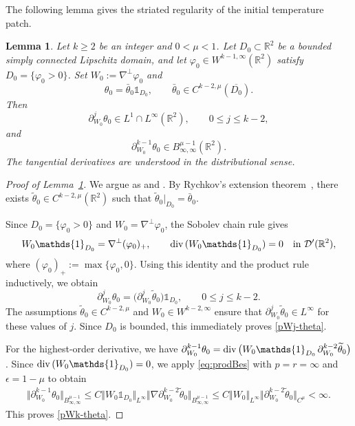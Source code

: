 \documentclass[reqno,11pt,a4paper]{amsart}
\newtheorem{lemma}[theorem]{Lemma}
\newcommand{\R}{\ensuremath{\mathbb{R}}}
\renewcommand{\div}{{\rm div\,}}
\begin{document}
The following lemma gives the striated regularity
of the initial temperature patch.
\begin{lemma}\label{lem:pWk-theta}
Let $k\geq2$ be an integer and $0<\mu<1$.
Let $D_0\subset\R^2$ be a bounded simply connected
Lipschitz domain, and let
$\varphi_0\in W^{k-1,\infty}(\R^2)$ satisfy
$D_0=\{\varphi_0>0\}$.
Set $W_0:=\nabla^\perp\varphi_0$ and
\[
  \theta_0=\bar\theta_0\mathds{1}_{D_0},
  \qquad
  \bar\theta_0\in C^{k-2,\mu}(\overline{D_0}).
\]
Then
\begin{equation}\label{pWj-theta}
  \partial_{W_0}^j\theta_0
  \in L^1\cap L^\infty(\R^2),
  \qquad 0\leq j\leq k-2,
\end{equation}
and
\begin{equation}\label{pWk-theta}
  \partial_{W_0}^{k-1}\theta_0
  \in B^{\mu-1}_{\infty,\infty}(\R^2).
\end{equation}
The tangential derivatives are understood
in the distributional sense.
\end{lemma}

\begin{proof}[Proof of Lemma~\ref{lem:pWk-theta}]
We argue as \cite[Proposition 3.1]{Sue15} and \cite[Lemma 2.6]{CMX22}.
By Rychkov's extension theorem~\cite{VSR1999},
there exists
$\widetilde\theta_0\in C^{k-2,\mu}(\R^2)$
such that
$\widetilde\theta_0|_{D_0}=\bar\theta_0$.

Since $D_0=\{\varphi_0>0\}$ and
$W_0=\nabla^\perp\varphi_0$,
the Sobolev chain rule gives
\[
  W_0\mathds{1}_{D_0}
  =\nabla^\perp(\varphi_0)_+,
  \qquad
  \div(W_0\mathds{1}_{D_0})=0
  \quad\text{in }\mathcal D'(\R^2),
\]
where $(\varphi_0)_+:=\max\{\varphi_0,0\}$.
Using this identity and the product rule inductively,
we obtain
\[
  \partial_{W_0}^j\theta_0
  =
  \bigl(\partial_{W_0}^j\widetilde\theta_0\bigr)
  \mathds{1}_{D_0},
  \qquad 0\leq j\leq k-2.
\]
The assumptions
$\widetilde\theta_0\in C^{k-2,\mu}$
and $W_0\in W^{k-2,\infty}$
ensure that
$\partial_{W_0}^j\widetilde\theta_0\in L^\infty$
for these values of $j$.
Since $D_0$ is bounded,
this immediately proves \eqref{pWj-theta}.

For the highest-order derivative, we have
$\partial_{W_0}^{k-1}\theta_0
  =
  \div\bigl(
    W_0\mathds{1}_{D_0}\,
    \partial_{W_0}^{k-2}\widetilde\theta_0
  \bigr)$.
Since $\div(W_0\mathds{1}_{D_0})=0$,
we apply \eqref{eq:prodBes} with $p=r=\infty$ and $\epsilon=1-\mu$ to obtain
\begin{align*}
  \Vert \partial_{W_0}^{k-1}\theta_0\Vert _{B^{\mu-1}_{\infty,\infty}}
  \leq
  C\Vert W_0\mathds{1}_{D_0}\Vert _{L^\infty}
  \Vert \nabla\partial_{W_0}^{k-2}\widetilde\theta_0
    \Vert _{B^{\mu-1}_{\infty,\infty}}
  \leq
  C\Vert W_0\Vert _{L^\infty}
  \Vert \partial_{W_0}^{k-2}\widetilde\theta_0\Vert _{C^\mu}
  <\infty.
\end{align*}
This proves \eqref{pWk-theta}. %
\end{proof}
\end{document}
